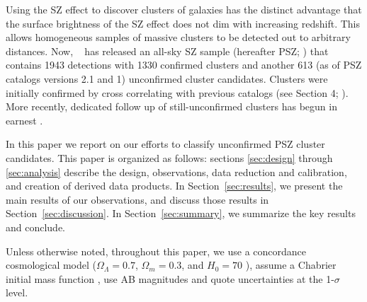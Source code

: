 \documentclass[apj, revtex4-1]{emulateapj}
\begin{document}
Using the SZ effect to discover clusters of galaxies has the distinct advantage that the surface brightness of the SZ effect does not dim with increasing redshift. This allows homogeneous samples of massive clusters to be detected out to arbitrary distances. Now, \planck\ \citep{Tauber2010, PlanckCollaboration2011} has released an all-sky SZ sample (hereafter PSZ; \citealt{PlanckCollaboration2014, PlanckCollaboration2015a}) that contains 1943 detections with 1330 confirmed clusters and another 613 (as of PSZ catalogs versions 2.1 and 1) unconfirmed cluster candidates. Clusters were initially confirmed by cross correlating with previous catalogs (see Section 4; \citealt{PlanckCollaboration2014}). More recently, dedicated follow up of still-unconfirmed clusters has begun in earnest .

In this paper we report on our efforts to classify unconfirmed PSZ cluster candidates. This paper is organized as follows: sections \ref{sec:design} through \ref{sec:analysis} describe the design, observations, data reduction and calibration, and creation of derived data products. In Section~\ref{sec:results}, we present the main results of our observations, and discuss those results in Section~\ref{sec:discussion}. In Section~\ref{sec:summary}, we summarize the key results and conclude.

Unless otherwise noted, throughout this paper, we use a concordance cosmological model ($\Omega_\Lambda = 0.7$, $\Omega_m = 0.3$, and $H_0= 70$ \kms \permpc), assume a Chabrier initial mass function \citep{Chabrier2003}, use AB magnitudes \citep{Oke1974} and quote uncertainties at the 1-$\sigma$ level.
\end{document}
